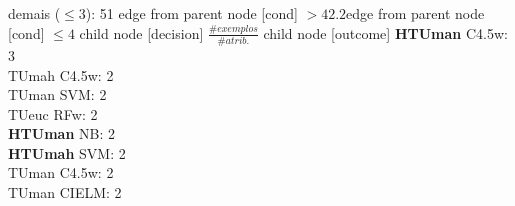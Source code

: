 {{{{%
demais ($\leq 3$): 51} edge from parent node [cond] {$>42.2$}}edge from parent node [cond] {$\leq4$}}
child {node [decision] {$\frac{\#exemplos}{\#atrib.}$}
child {node [outcome] {
\textbf{HTUman} C4.5w: 3\\
TUmah C4.5w: 2\\
TUman SVM: 2\\
TUeuc RFw: 2\\
\textbf{HTUman} NB: 2\\
\textbf{HTUmah} SVM: 2\\
TUman C4.5w: 2\\
TUman CIELM: 2\\
}}}}
